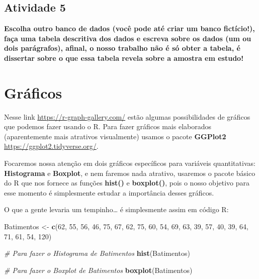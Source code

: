 \documentclass[
]{book}
\newenvironment{Shaded}{\begin{snugshade}}{\end{snugshade}}
\newcommand{\CommentTok}[1]{\textcolor[rgb]{0.56,0.35,0.01}{\textit{#1}}}
\newcommand{\DecValTok}[1]{\textcolor[rgb]{0.00,0.00,0.81}{#1}}
\newcommand{\FunctionTok}[1]{\textcolor[rgb]{0.13,0.29,0.53}{\textbf{#1}}}
\newcommand{\NormalTok}[1]{#1}
\newcommand{\OtherTok}[1]{\textcolor[rgb]{0.56,0.35,0.01}{#1}}
\begin{document}
\section{Atividade 5}\label{atividade-5}

\textbf{Escolha outro banco de dados (você pode até criar um banco fictício!), faça uma tabela descritiva dos dados e escreva sobre os dados (um ou dois parágrafos), afinal, o nosso trabalho não é só obter a tabela, é dissertar sobre o que essa tabela revela sobre a amostra em estudo!}

\chapter{Gráficos}\label{gruxe1ficos}

Nesse link \url{https://r-graph-gallery.com/} estão algumas possibilidades de gráficos que podemos fazer usando o R. Para fazer gráficos mais elaborados (aparentemente mais atrativos visualmente) usamos o pacote \textbf{GGPlot2} \url{https://ggplot2.tidyverse.org/}.

Focaremos nossa atenção em dois gráficos específicos para variáveis quantitativas: \textbf{Histograma} e \textbf{Boxplot}, e nem faremos nada atrativo, usaremos o pacote básico do R que nos fornece as funções \textbf{hist()} e \textbf{boxplot()}, pois o nosso objetivo para esse momento é simplesmente estudar a importância desses gráficos.

O que a gente levaria um tempinho\ldots{} é simplesmente assim em código R:

\begin{Shaded}
\begin{Highlighting}[]
\NormalTok{Batimentos }\OtherTok{\textless{}{-}} \FunctionTok{c}\NormalTok{(}\DecValTok{62}\NormalTok{, }\DecValTok{55}\NormalTok{, }\DecValTok{56}\NormalTok{, }\DecValTok{46}\NormalTok{, }\DecValTok{75}\NormalTok{, }\DecValTok{67}\NormalTok{, }\DecValTok{62}\NormalTok{, }\DecValTok{75}\NormalTok{, }\DecValTok{60}\NormalTok{, }\DecValTok{54}\NormalTok{, }\DecValTok{69}\NormalTok{, }\DecValTok{63}\NormalTok{, }\DecValTok{39}\NormalTok{, }\DecValTok{57}\NormalTok{, }\DecValTok{40}\NormalTok{, }\DecValTok{39}\NormalTok{, }\DecValTok{64}\NormalTok{, }\DecValTok{71}\NormalTok{, }\DecValTok{61}\NormalTok{, }\DecValTok{54}\NormalTok{, }\DecValTok{120}\NormalTok{)}

\CommentTok{\# Para fazer o Histograma de Batimentos}
\FunctionTok{hist}\NormalTok{(Batimentos)}

\CommentTok{\# Para fazer o Boxplot de Batimentos}
\FunctionTok{boxplot}\NormalTok{(Batimentos)}
\end{Highlighting}
\end{Shaded}
\end{document}
